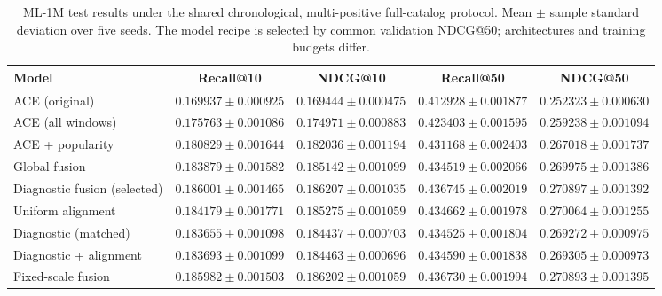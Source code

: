 \begin{table}[t]
\centering\footnotesize
\setlength{\tabcolsep}{4pt}
\caption{ML-1M test results under the shared chronological, multi-positive full-catalog protocol. Mean $\pm$ sample standard deviation over five seeds. The model recipe is selected by common validation NDCG@50; architectures and training budgets differ.}
\label{tab:fafirec-v4-ace}
\begin{tabular}{lcccc}
\hline
Model & Recall@10 & NDCG@10 & Recall@50 & NDCG@50 \\
\hline
ACE (original) & $0.169937 \pm 0.000925$ & $0.169444 \pm 0.000475$ & $0.412928 \pm 0.001877$ & $0.252323 \pm 0.000630$ \\
ACE (all windows) & $0.175763 \pm 0.001086$ & $0.174971 \pm 0.000883$ & $0.423403 \pm 0.001595$ & $0.259238 \pm 0.001094$ \\
ACE + popularity & $0.180829 \pm 0.001644$ & $0.182036 \pm 0.001194$ & $0.431168 \pm 0.002403$ & $0.267018 \pm 0.001737$ \\
Global fusion & $0.183879 \pm 0.001582$ & $0.185142 \pm 0.001099$ & $0.434519 \pm 0.002066$ & $0.269975 \pm 0.001386$ \\
Diagnostic fusion (selected) & $0.186001 \pm 0.001465$ & $0.186207 \pm 0.001035$ & $0.436745 \pm 0.002019$ & $0.270897 \pm 0.001392$ \\
Uniform alignment & $0.184179 \pm 0.001771$ & $0.185275 \pm 0.001059$ & $0.434662 \pm 0.001978$ & $0.270064 \pm 0.001255$ \\
Diagnostic (matched) & $0.183655 \pm 0.001098$ & $0.184437 \pm 0.000703$ & $0.434525 \pm 0.001804$ & $0.269272 \pm 0.000975$ \\
Diagnostic + alignment & $0.183693 \pm 0.001099$ & $0.184463 \pm 0.000696$ & $0.434590 \pm 0.001838$ & $0.269305 \pm 0.000973$ \\
Fixed-scale fusion & $0.185982 \pm 0.001503$ & $0.186202 \pm 0.001059$ & $0.436730 \pm 0.001994$ & $0.270893 \pm 0.001395$ \\
\hline
\end{tabular}
\end{table}
